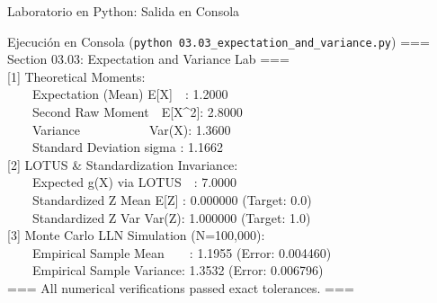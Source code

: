 \documentclass[10pt, aspectratio=169]{beamer}
\begin{document}
\begin{frame}[fragile]{Laboratorio en Python: Salida en Consola}
  \begin{block}{Ejecución en Consola (\texttt{python 03.03\_expectation\_and\_variance.py})}
    \fontsize{6.5pt}{7.5pt}\selectfont\ttfamily
=== Section 03.03: Expectation and Variance Lab ===\\[0.1cm]
{[1]} Theoretical Moments:\\
\ \ \ \ Expectation (Mean) E[X]\ \ : 1.2000\\
\ \ \ \ Second Raw Moment\ \ E[X\^{}2]: 2.8000\\
\ \ \ \ Variance\ \ \ \ \ \ \ \ \ \ \ Var(X): 1.3600\\
\ \ \ \ Standard Deviation sigma : 1.1662\\[0.1cm]
{[2]} LOTUS \& Standardization Invariance:\\
\ \ \ \ Expected g(X) via LOTUS\ \ : 7.0000\\
\ \ \ \ Standardized Z Mean E[Z] : 0.000000 (Target: 0.0)\\
\ \ \ \ Standardized Z Var Var(Z): 1.000000 (Target: 1.0)\\[0.1cm]
{[3]} Monte Carlo LLN Simulation (N=100,000):\\
\ \ \ \ Empirical Sample Mean\ \ \ \ : 1.1955 (Error: 0.004460)\\
\ \ \ \ Empirical Sample Variance: 1.3532 (Error: 0.006796)\\[0.1cm]
=== All numerical verifications passed exact tolerances. ===
  \end{block}
\end{frame}





\end{document}
